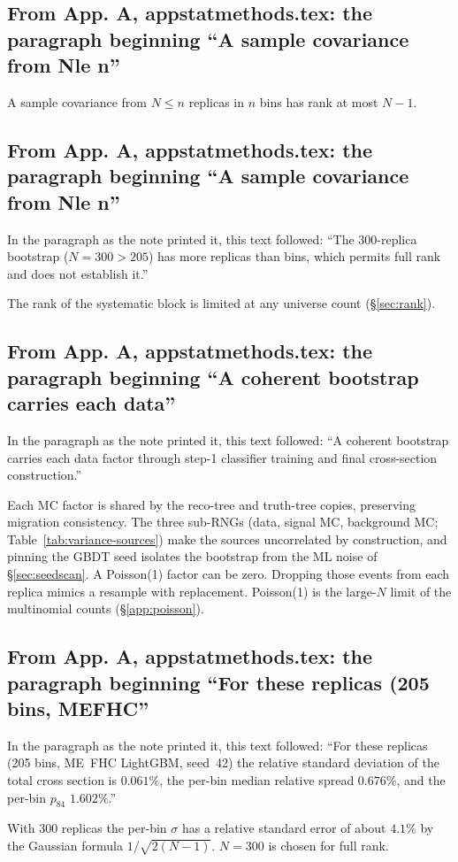 \subsection{From App. A, appstatmethods.tex: the paragraph beginning ``A sample covariance from Nle n''}
A sample covariance from $N\le n$ replicas in $n$ bins has rank at most $N-1$.

\subsection{From App. A, appstatmethods.tex: the paragraph beginning ``A sample covariance from Nle n''}
In the paragraph as the note printed it, this text followed: ``The 300-replica bootstrap ($N=300 > 205$) has more replicas than bins, which permits full rank and does not establish it.''\par
The rank of the systematic block is limited at any universe count (\S\ref{sec:rank}).

\subsection{From App. A, appstatmethods.tex: the paragraph beginning ``A coherent bootstrap carries each data''}
In the paragraph as the note printed it, this text followed: ``A coherent bootstrap carries each data factor through step-1 classifier training and final cross-section construction.''\par
Each MC factor is shared by the reco-tree and truth-tree copies, preserving migration consistency. The three sub-RNGs (data, signal MC, background MC; Table~\ref{tab:variance-sources}) make the sources uncorrelated by construction, and pinning the GBDT seed isolates the bootstrap from the ML noise of \S\ref{sec:seedscan}. A Poisson(1) factor can be zero. Dropping those events from each replica mimics a resample with replacement. Poisson(1) is the large-$N$ limit of the multinomial counts (\S\ref{app:poisson}).

\subsection{From App. A, appstatmethods.tex: the paragraph beginning ``For these replicas (205 bins, MEFHC''}
In the paragraph as the note printed it, this text followed: ``For these replicas (205 bins, ME~FHC LightGBM, seed~42) the relative standard deviation of the total cross section is $\boxed{0.061\%}$, the per-bin median relative spread $\boxed{0.676\%}$, and the per-bin $p_{84}$ $1.602\%$.''\par
With $300$ replicas the per-bin $\sigma$ has a relative standard error of about $4.1\%$ by the Gaussian formula $1/\sqrt{2(N-1)}$. $N=300$ is chosen for full rank.

